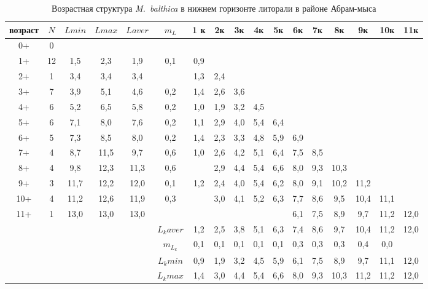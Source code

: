\begin{landscape}
\begin{table}[h]
\caption{Возрастная структура {\it M.~balthica} в нижнем горизонте литорали в районе Абрам-мыса }
\label{tab:Abram_ngl_growth_matrix}
\begin{tabular}{|c|c|cc|cc|ccccccccccc|}
\hline
возраст & $N$  & $L min$ & $L max$ & $L aver$ & $m_L$   & 1 к & 2к  & 3к  & 4к  & 5к  & 6к  & 7к  & 8к   & 9к   & 10к  & 11к  \\ \hline
0+      & 0  &       &       &         &         &     &     &     &     &     &     &     &      &      &      &      \\
1+      & 12 & 1,5   & 2,3   & 1,9     & 0,1     & 0,9 &     &     &     &     &     &     &      &      &      &      \\
2+      & 1  & 3,4   & 3,4   & 3,4     &         & 1,3 & 2,4 &     &     &     &     &     &      &      &      &      \\
3+      & 7  & 3,9   & 5,1   & 4,6     & 0,2     & 1,4 & 2,6 & 3,6 &     &     &     &     &      &      &      &      \\
4+      & 6  & 5,2   & 6,5   & 5,8     & 0,2     & 1,0 & 1,9 & 3,2 & 4,5 &     &     &     &      &      &      &      \\
5+      & 6  & 7,1   & 8,0   & 7,6     & 0,2     & 1,1 & 2,9 & 4,0 & 5,4 & 6,4 &     &     &      &      &      &      \\
6+      & 5  & 7,3   & 8,5   & 8,0     & 0,2     & 1,4 & 2,3 & 3,3 & 4,8 & 5,9 & 6,9 &     &      &      &      &      \\
7+      & 4  & 8,7   & 11,5  & 9,7     & 0,6     & 1,0 & 2,6 & 4,2 & 5,1 & 6,4 & 7,5 & 8,5 &      &      &      &      \\
8+      & 4  & 9,8   & 12,3  & 11,3    & 0,6     &     & 2,9 & 4,4 & 5,4 & 6,6 & 8,0 & 9,3 & 10,3 &      &      &      \\
9+      & 3  & 11,7  & 12,2  & 12,0    & 0,1     & 1,2 & 2,4 & 4,0 & 5,4 & 6,2 & 8,0 & 9,1 & 10,2 & 11,2 &      &      \\
10+     & 4  & 11,2  & 12,6  & 11,9    & 0,3     &     & 3,0 & 4,1 & 5,2 & 6,3 & 7,7 & 8,6 & 9,5  & 10,4 & 11,1 &      \\
11+     & 1  & 13,0  & 13,0  & 13,0    &         &     &     &     &     &     & 6,1 & 7,5 & 8,9  & 9,7  & 11,2 & 12,0 \\\hline
        &    &       &       &         & $L_k aver$ & 1,2 & 2,5 & 3,8 & 5,1 & 6,3 & 7,4 & 8,6 & 9,7  & 10,4 & 11,2 & 12,0 \\
        &    &       &       &         & $m_{L_k}$  & 0,1 & 0,1 & 0,1 & 0,1 & 0,1 & 0,3 & 0,3 & 0,3  & 0,4  & 0,0  &      \\
        &    &       &       &         & $L_k min$  & 0,9 & 1,9 & 3,2 & 4,5 & 5,9 & 6,1 & 7,5 & 8,9  & 9,7  & 11,1 & 12,0 \\
        &    &       &       &         & $L_k max$  & 1,4 & 3,0 & 4,4 & 5,4 & 6,6 & 8,0 & 9,3 & 10,3 & 11,2 & 11,2 & 12,0 \\ \hline
\end{tabular}
\end{table}


\end{landscape}
